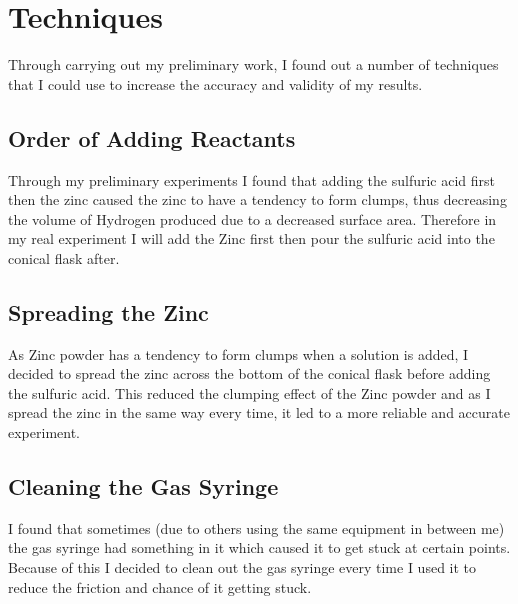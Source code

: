 \section {Techniques}

Through carrying out my preliminary work, I found out a number of techniques that I could use to increase the accuracy and validity of my results.

	\subsection{Order of Adding Reactants}

Through my preliminary experiments I found that adding the sulfuric acid first then the zinc caused the zinc to have a tendency to form clumps, thus decreasing the volume of Hydrogen produced due to a decreased surface area. Therefore in my real experiment I will add the Zinc first then pour the sulfuric acid into the conical flask after.

	\subsection{Spreading the Zinc}

As Zinc powder has a tendency to form clumps when a solution is added, I decided to spread the zinc across the bottom of the conical flask before adding the sulfuric acid. This reduced the clumping effect of the Zinc powder and as I spread the zinc in the same way every time, it led to a more reliable and accurate experiment.

	\subsection{Cleaning the Gas Syringe}

I found that sometimes (due to others using the same equipment in between me) the gas syringe had something in it which caused it to get stuck at certain points. Because of this I decided to clean out the gas syringe every time I used it to reduce the friction and chance of it getting stuck.

	